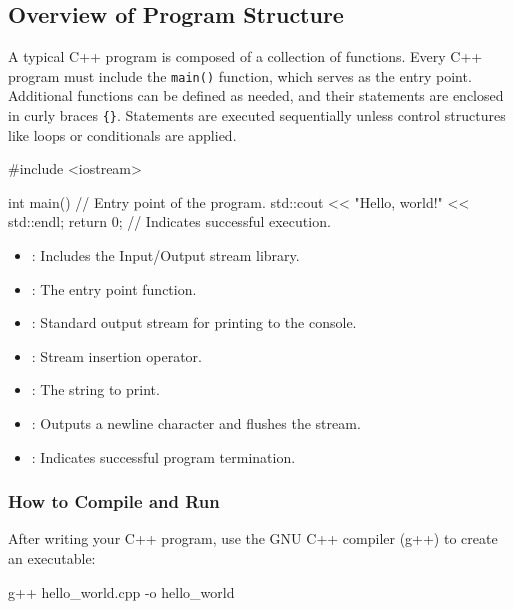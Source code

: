 \subsection{Overview of Program Structure}

A typical C++ program is composed of a collection of functions. Every C++ program must include the \texttt{main()} function, which serves as the entry point. Additional functions can be defined as needed, and their statements are enclosed in curly braces \texttt{\{\}}. Statements are executed sequentially unless control structures like loops or conditionals are applied.

\begin{exampleblock}
    \begin{codeblock}[language=C++]
#include <iostream>

int main() { // Entry point of the program.
    std::cout << "Hello, world!" << std::endl;
    return 0; // Indicates successful execution.
}
\end{codeblock}
\end{exampleblock}

\begin{itemize}
    \item {}: Includes the Input/Output stream library.
    \item {}: The entry point function.
    \item {}: Standard output stream for printing to the console.
    \item \plaintt{<<}: Stream insertion operator.
    \item {}: The string to print.
    \item {}: Outputs a newline character and flushes the stream.
    \item {}: Indicates successful program termination.
\end{itemize}

\subsubsection{How to Compile and Run}

After writing your C++ program, use the GNU C++ compiler (g++) to create an executable:

\begin{codeblock}[language=bash, numbers=none]
g++ hello_world.cpp -o hello_world
\end{codeblock}

